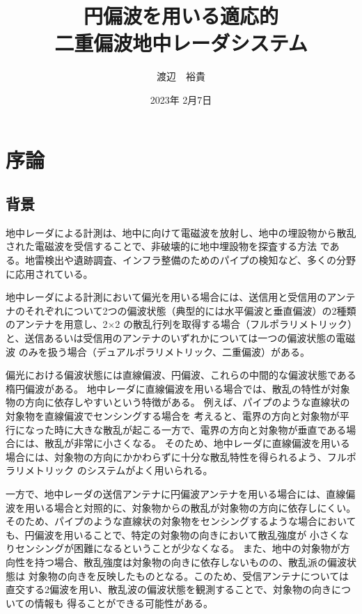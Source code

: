 \documentclass[11pt,a4paper,uplatex]{ujarticle}
\title{円偏波を用いる適応的\\二重偏波地中レーダシステム}
\date{2023年 2月7日}
\author{渡辺　裕貴}
\begin{document}
\maketitle
\newpage
\tableofcontents
\newpage
\section{序論}

  \subsection{背景}\label{sec:background}

  地中レーダによる計測は、地中に向けて電磁波を放射し、地中の埋設物から散乱された電磁波を受信することで、非破壊的に地中埋設物を探査する方法
  である。地雷検出や遺跡調査、インフラ整備のためのパイプの検知など、多くの分野に応用されている\cite{landmine_example}\cite{remains_example}。

  地中レーダによる計測において偏光を用いる場合には、送信用と受信用のアンテナのそれぞれについて2つの偏波状態（典型的には水平偏波と垂直偏波）の2種類のアンテナを用意し、2$\times$2
  の散乱行列を取得する場合（フルポラリメトリック）と、送信あるいは受信用のアンテナのいずれかについては一つの偏波状態の電磁波
  のみを扱う場合（デュアルポラリメトリック、二重偏波）がある。

  偏光における偏波状態には直線偏波、円偏波、これらの中間的な偏波状態である楕円偏波がある。
  地中レーダに直線偏波を用いる場合では、散乱の特性が対象物の方向に依存しやすいという特徴がある。
  例えば、パイプのような直線状の対象物を直線偏波でセンシングする場合を
  考えると、電界の方向と対象物が平行になった時に大きな散乱が起こる一方で、電界の方向と対象物が垂直である場合には、散乱が非常に小さくなる。
  そのため、地中レーダに直線偏波を用いる場合には、対象物の方向にかかわらずに十分な散乱特性を得られるよう、フルポラリメトリック
  のシステムがよく用いられる。

  一方で、地中レーダの送信アンテナに円偏波アンテナを用いる場合には、直線偏波を用いる場合と対照的に、対象物からの散乱が対象物の方向に依存しにくい。
  そのため、パイプのような直線状の対象物をセンシングするような場合においても、円偏波を用いることで、特定の対象物の向きにおいて散乱強度が
  小さくなりセンシングが困難になるということが少なくなる。
  また、地中の対象物が方向性を持つ場合、散乱強度は対象物の向きに依存しないものの、散乱派の偏波状態は
  対象物の向きを反映したものとなる。このため、受信アンテナについては直交する2偏波を用い、散乱波の偏波状態を観測することで、対象物の向きについての情報も
  得ることができる可能性がある。
  
\end{document}
